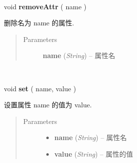 \documentclass[letterpaper,10pt,english]{sphinxmanual}
\begin{document}
\begin{fulllineitems}
\label{api/core/base/attribute:attribute.removeAttr}~
\begin{DUlineblock}{0em}
\item[] void \textbf{removeAttr} ( name )
\item[] 删除名为 name 的属性.
\end{DUlineblock}
\begin{quote}\begin{description}
\item[{Parameters}] \leavevmode
\textbf{name} (\emph{String}) -- 属性名

\end{description}\end{quote}

\end{fulllineitems}



\begin{fulllineitems}
\label{api/core/base/attribute:attribute.set}~
\begin{DUlineblock}{0em}
\item[] void \textbf{set} ( name, value )
\item[] 设置属性 name 的值为 value.
\end{DUlineblock}
\begin{quote}\begin{description}
\item[{Parameters}] \leavevmode\begin{itemize}
\item {}
\textbf{name} (\emph{String}) -- 属性名

\item {}
\textbf{value} (\emph{String}) -- 属性的值

\end{itemize}

\end{description}\end{quote}

\end{fulllineitems}


\end{document}
